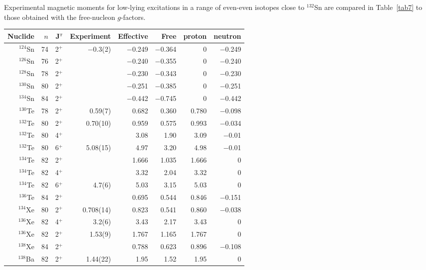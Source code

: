 \documentclass[aps,twocolumn,superscriptaddress,prc,showpacs]{revtex4}
\begin{document}
Experimental magnetic moments for low-lying excitations
in a range of even-even isotopes close to $^{132}$Sn are
compared in Table~\ref{tab7} to those
obtained with the free-nucleon $  g  $-factors.
\begingroup
\begin{table*}
 \caption{\label{tab7}Experimental and calculated magnetic moments.
The calculations use the free-nucleon $  g  $-factors and
 effective $  g  $-factors. The last two columns give the proton
and neutron contributions 
to the effective operator moments. Results for 4$^{ + }$ and 6$^{ + }$ states
are added
for comparison to related experiment data.}
\begin{ruledtabular}
\begin{tabular}{rrrrrrrr}
 Nuclide & $n$ & J$^{ \pi }$ & Experiment  &
Effective & Free & proton & neutron \\
\hline
 $^{124}$Sn & 74 & 2$^{ + }$ & $-$0.3(2)\protect\cite{hass}  & $-$0.249 & $-$0.364 & 0 & $-$0.249 \\
 $^{126}$Sn & 76 & 2$^{ + }$ &          & $-$0.240  & $-$0.355 & 0 & $-$0.240  \\
 $^{128}$Sn & 78 & 2$^{ + }$ &          & $-$0.230  & $-$0.343 & 0 & $-$0.230   \\
 $^{130}$Sn & 80 & 2$^{ + }$ &          & $-$0.251  & $-$0.385 & 0 & $-$0.251   \\
 $^{134}$Sn & 84 & 2$^{ + }$ &          & $-$0.442  & $-$0.745 & 0 & $-$0.442\\
\hline
 $^{130}$Te & 78 & 2$^{ + }$ & 0.59(7)\protect\cite{te130a}  & 0.682 & 0.360  & 0.780 & $-$0.098  \\
 $^{132}$Te & 80 & 2$^{ + }$ & 0.70(10)\protect\cite{ENAM} & 0.959 & 0.575  & 0.993 & $-$0.034\\
 $^{132}$Te & 80 & 4$^{ + }$ &          & 3.08   & 1.90  & 3.09 & $-$0.01  \\
 $^{132}$Te & 80 & 6$^{ + }$ & 5.08(15)\protect\cite{te132j6} & 4.97   & 3.20  & 4.98 & $-$0.01  \\
 $^{134}$Te & 82 & 2$^{ + }$ &          & 1.666 & 1.035  & 1.666 & 0 \\
 $^{134}$Te & 82 & 4$^{ + }$ &          & 3.32   & 2.04  & 3.32 & 0 \\
 $^{134}$Te & 82 & 6$^{ + }$ & 4.7(6)\protect\cite{te134j6}   & 5.03   & 3.15  & 5.03 & 0 \\
 $^{136}$Te & 84 & 2$^{ + }$ &          & 0.695 & 0.544  & 0.846 & $-$0.151\\
\hline
 $^{134}$Xe & 80 & 2$^{ + }$ & 0.708(14)\protect\cite{jak02}  & 0.823  & 0.541  & 0.860 & $-$0.038 \\
 $^{136}$Xe & 82 & 4$^{ + }$ & 3.2(6)\protect\cite{xe136j4}   & 3.43   & 2.17  & 3.43 & 0 \\
 $^{136}$Xe & 82 & 2$^{ + }$ & 1.53(9)\protect\cite{jak02}  & 1.767  & 1.165  & 1.767 & 0\\
 $^{138}$Xe & 84 & 2$^{ + }$ &          & 0.788  & 0.623 & 0.896 & $-$0.108 \\
 $^{138}$Ba & 82 & 2$^{ + }$ & 1.44(22)\protect\cite{ba138j2} & 1.95   & 1.52  & 1.95 & 0 \\
\end{tabular}
\end{ruledtabular}
\end{table*}
\end{document}
